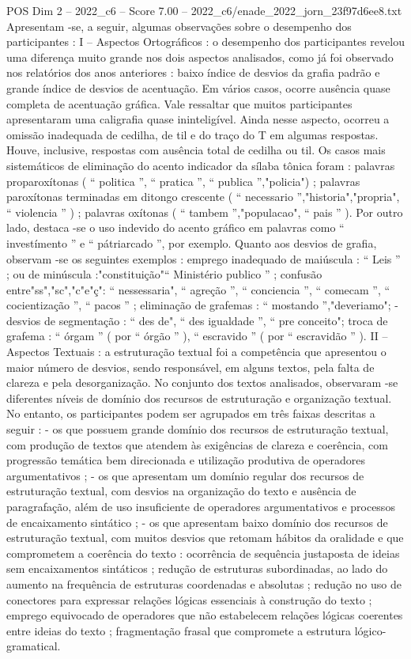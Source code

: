 \begin{textsample}{POS Dim 2 – 2022\_c6 – Score 7.00 – 2022\_c6/enade\_2022\_jorn\_23f97d6ee8.txt}
Apresentam -se, a seguir, algumas observações sobre o desempenho dos participantes : I – Aspectos Ortográficos : o desempenho dos participantes revelou uma diferença muito grande nos dois aspectos analisados, como já foi observado nos relatórios dos anos anteriores : baixo índice de desvios da grafia padrão e grande índice de desvios de acentuação.
Em vários casos, ocorre ausência quase completa de acentuação gráfica.
Vale ressaltar que muitos participantes apresentaram uma caligrafia quase ininteligível.
Ainda nesse aspecto, ocorreu a omissão inadequada de cedilha, de til e do traço do T em algumas respostas.
Houve, inclusive, respostas com ausência total de cedilha ou til.
Os casos mais sistemáticos de eliminação do acento indicador da sílaba tônica foram : palavras proparoxítonas ( “ politica ”, “ pratica ”, “ publica ”,"policia") ; palavras paroxítonas terminadas em ditongo crescente ( “ necessario ”,"historia","propria", “ violencia ” ) ; palavras oxítonas ( “ tambem ”,"populacao", “ pais ” ).
Por outro lado, destaca -se o uso indevido do acento gráfico em palavras como “ investímento ” e “ pátriarcado ”, por exemplo.
Quanto aos desvios de grafia, observam -se os seguintes exemplos : emprego inadequado de maiúscula : “ Leis ” ; ou de minúscula :"constituição"“ Ministério publico ” ; confusão entre"ss","sc","c"e"ç": “ nessessaria", “ agreção ”, “ conciencia ”, “ comecam ”, “ cocientização ”, “ pacos ” ; eliminação de grafemas : “ mostando ”,"deveriamo"; - desvios de segmentação : “ des de", “ des igualdade ”, “ pre conceito"; troca de grafema : “ órgam ” ( por “ órgão ” ), “ escravido ” ( por “ escravidão ” ).
II – Aspectos Textuais : a estruturação textual foi a competência que apresentou o maior número de desvios, sendo responsável, em alguns textos, pela falta de clareza e pela desorganização.
No conjunto dos textos analisados, observaram -se diferentes níveis de domínio dos recursos de estruturação e organização textual.
No entanto, os participantes podem ser agrupados em três faixas descritas a seguir : - os que possuem grande domínio dos recursos de estruturação textual, com produção de textos que atendem às exigências de clareza e coerência, com progressão temática bem direcionada e utilização produtiva de operadores argumentativos ; - os que apresentam um domínio regular dos recursos de estruturação textual, com desvios na organização do texto e ausência de paragrafação, além de uso insuficiente de operadores argumentativos e processos de encaixamento sintático ; - os que apresentam baixo domínio dos recursos de estruturação textual, com muitos desvios que retomam hábitos da oralidade e que comprometem a coerência do texto : ocorrência de sequência justaposta de ideias sem encaixamentos sintáticos ; redução de estruturas subordinadas, ao lado do aumento na frequência de estruturas coordenadas e absolutas ; redução no uso de conectores para expressar relações lógicas essenciais à construção do texto ; emprego equivocado de operadores que não estabelecem relações lógicas coerentes entre ideias do texto ; fragmentação frasal que compromete a estrutura lógico-gramatical.

\end{textsample}

